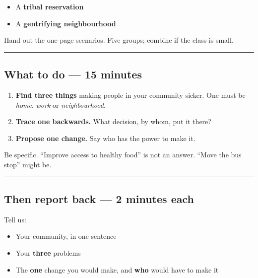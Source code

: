 \documentclass[
  letterpaper,
  DIV=11,
  numbers=noendperiod]{scrartcl}
\providecommand{\tightlist}{%
  \setlength{\itemsep}{0pt}\setlength{\parskip}{0pt}}
\begin{document}
\begin{itemize}
\tightlist
\item
  A \textbf{tribal reservation}
\item
  A \textbf{gentrifying neighbourhood}
\end{itemize}

Hand out the one-page scenarios. Five groups; combine if the class is
small.

\begin{center}\rule{0.5\linewidth}{0.5pt}\end{center}

\subsection{\texorpdfstring{{\textbf{What to do --- 15
minutes}}}{What to do --- 15 minutes}}\label{what-to-do-15-minutes}

\begin{enumerate}
\def\labelenumi{\arabic{enumi}.}
\item
  \textbf{Find three things} making people in your community sicker. One
  must be \emph{home}, \emph{work} or \emph{neighbourhood}.
\item
  \textbf{Trace one backwards.} What decision, by whom, put it there?
\item
  \textbf{Propose one change.} Say who has the power to make it.
\end{enumerate}

Be specific. ``Improve access to healthy food'' is not an answer. ``Move
the bus stop'' might be.

\begin{center}\rule{0.5\linewidth}{0.5pt}\end{center}

\subsection{\texorpdfstring{{\textbf{Then report back --- 2 minutes
each}}}{Then report back --- 2 minutes each}}\label{then-report-back-2-minutes-each}

Tell us:

\begin{itemize}
\tightlist
\item
  Your community, in one sentence
\item
  Your \textbf{three} problems
\item
  The \textbf{one} change you would make, and \textbf{who} would have to
  make it
\end{itemize}
\end{document}

